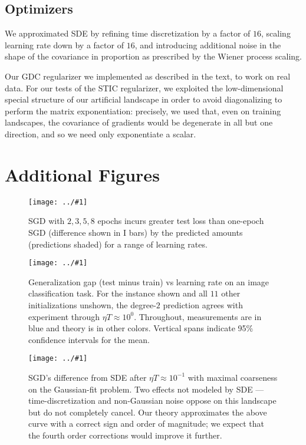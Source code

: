 \documentclass{article}
\theoremstyle{plain}
\theoremstyle{definition}
\newcommand{\plotmoow}[3]{\texttt{[image: ../\#1]}}
\begin{document}
    \subsection{Optimizers}
        We approximated SDE by refining time discretization by a factor of
        $16$, scaling learning rate down by a factor of $16$, and introducing
        additional noise in the shape of the covariance in proportion as
        prescribed by the Wiener process scaling.

        Our GDC regularizer we implemented as described in the text, to work
        on real data.  For our tests of the STIC regularizer, we exploited the
        low-dimensional special structure of our artificial landscape in order
        to avoid diagonalizing to perform the matrix exponentiation: precisely,
        we used that, even on training landscapes, the covariance of gradients
        would be degenerate in all but one direction, and so we need only 
        exponentiate a scalar.

\section{Additional Figures}\label{sect:figures}

    \begin{figure}[h]
        \centering
        \plotmoow{plots/multi-fashion-logistic-0}{0.98\columnwidth}{4.0cm}
        \caption{
            SGD with $2, 3, 5, 8$ epochs incurs greater test
            loss than one-epoch SGD (difference shown in I bars) by the
            predicted amounts (predictions shaded) for a range of learning
            rates.
        }
        \label{fig:multi}
    \end{figure}

    \begin{figure}[h]
        \centering
        \plotmoow{plots/gen-cifar}{0.98\columnwidth}{3.0cm}
        \caption{
            Generalization gap (test minus train) vs learning rate on an
            image classification task.  For the instance shown and all $11$
            other initializations unshown, the degree-$2$ prediction agrees
            with experiment through $\eta T \approx 10^0$.  Throughout,
            measurements are in blue and theory is in other colors.
            Vertical spans indicate 95\% confidence intervals for the mean.
        }
        \label{fig:gen}
    \end{figure}

    \begin{figure}[h] 
        \centering
        \plotmoow{plots/vs-sde}{0.98\columnwidth}{4.0cm}
        \caption{
            SGD's difference from SDE after $\eta T \approx
            10^{-1}$ with maximal coarseness on the Gaussian-fit problem.  
            Two effects not modeled by SDE --- time-discretization and
            non-Gaussian noise oppose on this landscape but do not
            completely cancel.  Our theory approximates the above curve with
            a correct sign and order of magnitude; we expect that the fourth
            order corrections would improve it further.
        }
        \label{fig:vssde}
    \end{figure}
\end{document}
